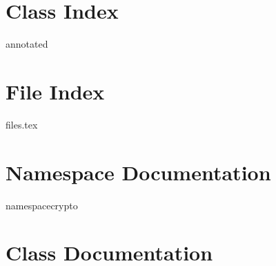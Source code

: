 

\renewcommand{\DOXYGENFOLDER}{../../CryptoGateway/Documentation/doxygenFiles/latex/}
	
	\chapter{Class Index}
		{annotated}
	\chapter{File Index}
		{files.tex}
	\chapter{Namespace Documentation}
		{namespacecrypto}
		
	\chapter{Class Documentation}
	
